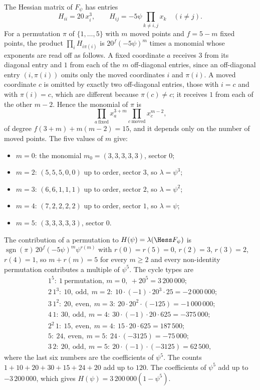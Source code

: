 The Hessian matrix of $F_\psi$ has entries
\[
H_{ii}=20\,x_i^3,\qquad H_{ij}=-5\psi\prod_{k\ne i,j}x_k\quad(i\ne j).
\]
For a permutation $\pi$ of $\{1,\dots,5\}$ with $m$ moved points and
$f=5-m$ fixed points, the product $\prod_iH_{i\pi(i)}$ is
$20^f(-5\psi)^m$ times a monomial whose exponents are read off as follows.
A fixed coordinate $a$ receives $3$ from its diagonal entry and $1$ from each
of the $m$ off-diagonal entries, since an off-diagonal entry $(i,\pi(i))$
omits only the moved coordinates $i$ and $\pi(i)$. A moved coordinate $c$
is omitted by exactly two off-diagonal entries, those with $i=c$ and with
$\pi(i)=c$, which are different because $\pi(c)\ne c$; it receives $1$ from
each of the other $m-2$. Hence the monomial of $\pi$ is
\[
\prod_{a\ \mathrm{fixed}}x_a^{3+m}\prod_{c\ \mathrm{moved}}x_c^{m-2},
\]
of degree $f(3+m)+m(m-2)=15$, and it depends only on the number of moved
points. The five values of $m$ give:
\begin{itemize}[leftmargin=*,itemsep=1pt]
\item $m=0$: the monomial $m_0=(3,3,3,3,3)$, sector $0$;
\item $m=2$: $(5,5,5,0,0)$ up to order, sector $3$, so $\lambda=\psi^3$;
\item $m=3$: $(6,6,1,1,1)$ up to order, sector $2$, so $\lambda=\psi^2$;
\item $m=4$: $(7,2,2,2,2)$ up to order, sector $1$, so $\lambda=\psi$;
\item $m=5$: $(3,3,3,3,3)$, sector $0$.
\end{itemize}
The contribution of a permutation to $H(\psi)=\lambda(\Hess F_\psi)$ is
$\operatorname{sgn}(\pi)\,20^f(-5\psi)^m\psi^{r(m)}$ with $r(0)=r(5)=0$,
$r(2)=3$, $r(3)=2$, $r(4)=1$, so $m+r(m)=5$ for every $m\ge2$ and every
non-identity permutation contributes a multiple of $\psi^5$. The cycle
types are
\[
\begin{aligned}
&1^5:\ 1\ \text{permutation, }m=0,\ +20^5=3\,200\,000;\\
&2\,1^3:\ 10,\ \text{odd},\ m=2:\ 10\cdot(-1)\cdot20^3\cdot25=-2\,000\,000;\\
&3\,1^2:\ 20,\ \text{even},\ m=3:\ 20\cdot20^2\cdot(-125)=-1\,000\,000;\\
&4\,1:\ 30,\ \text{odd},\ m=4:\ 30\cdot(-1)\cdot20\cdot625=-375\,000;\\
&2^2\,1:\ 15,\ \text{even},\ m=4:\ 15\cdot20\cdot625=187\,500;\\
&5:\ 24,\ \text{even},\ m=5:\ 24\cdot(-3125)=-75\,000;\\
&3\,2:\ 20,\ \text{odd},\ m=5:\ 20\cdot(-1)\cdot(-3125)=62\,500,
\end{aligned}
\]
where the last six numbers are the coefficients of $\psi^5$. The counts
$1+10+20+30+15+24+20$ add up to $120$. The coefficients of $\psi^5$ add up
to $-3\,200\,000$, which gives $H(\psi)=3\,200\,000(1-\psi^5)$.

